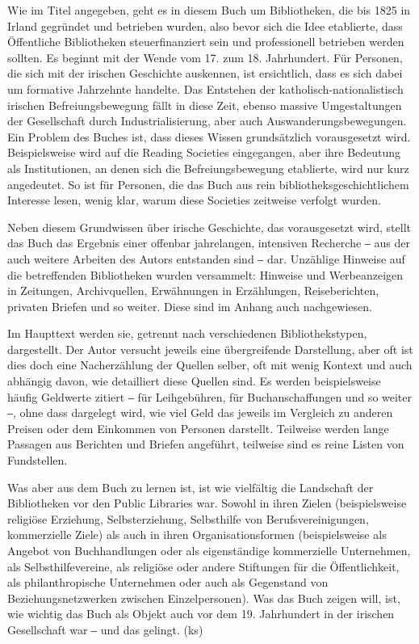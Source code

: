 \documentclass[a4paper,
fontsize=11pt,
oneside,
numbers=noperiodatend,
parskip=half-,
bibliography=totoc,
final
]{scrartcl}
\begin{document}
Wie im Titel angegeben, geht es in diesem Buch um Bibliotheken, die bis
1825 in Irland gegründet und betrieben wurden, also bevor sich die Idee
etablierte, dass Öffentliche Bibliotheken steuerfinanziert sein und
professionell betrieben werden sollten. Es beginnt mit der Wende vom 17.
zum 18. Jahrhundert. Für Personen, die sich mit der irischen Geschichte
auskennen, ist ersichtlich, dass es sich dabei um formative Jahrzehnte
handelte. Das Entstehen der katholisch-nationalistisch irischen
Befreiungsbewegung fällt in diese Zeit, ebenso massive Umgestaltungen
der Gesellschaft durch Industrialisierung, aber auch
Auswanderungsbewegungen. Ein Problem des Buches ist, dass dieses Wissen
grundsätzlich vorausgesetzt wird. Beispielsweise wird auf die Reading
Societies eingegangen, aber ihre Bedeutung als Institutionen, an denen
sich die Befreiungsbewegung etablierte, wird nur kurz angedeutet. So ist
für Personen, die das Buch aus rein bibliotheksgeschichtlichem Interesse
lesen, wenig klar, warum diese Societies zeitweise verfolgt wurden.

Neben diesem Grundwissen über irische Geschichte, das vorausgesetzt
wird, stellt das Buch das Ergebnis einer offenbar jahrelangen,
intensiven Recherche ‒ aus der auch weitere Arbeiten des Autors
entstanden sind ‒ dar. Unzählige Hinweise auf die betreffenden
Bibliotheken wurden versammelt: Hinweise und Werbeanzeigen in Zeitungen,
Archivquellen, Erwähnungen in Erzählungen, Reiseberichten, privaten
Briefen und so weiter. Diese sind im Anhang auch nachgewiesen.

Im Haupttext werden sie, getrennt nach verschiedenen Bibliothekstypen,
dargestellt. Der Autor versucht jeweils eine übergreifende Darstellung,
aber oft ist dies doch eine Nacherzählung der Quellen selber, oft mit
wenig Kontext und auch abhängig davon, wie detailliert diese Quellen
sind. Es werden beispielsweise häufig Geldwerte zitiert ‒ für
Leihgebühren, für Buchanschaffungen und so weiter ‒, ohne dass dargelegt
wird, wie viel Geld das jeweils im Vergleich zu anderen Preisen oder dem
Einkommen von Personen darstellt. Teilweise werden lange Passagen aus
Berichten und Briefen angeführt, teilweise sind es reine Listen von
Fundstellen.

Was aber aus dem Buch zu lernen ist, ist wie vielfältig die Landschaft
der Bibliotheken vor den Public Libraries war. Sowohl in ihren Zielen
(beispielsweise religiöse Erziehung, Selbsterziehung, Selbsthilfe von
Berufsvereinigungen, kommerzielle Ziele) als auch in ihren
Organisationsformen (beispielsweise als Angebot von Buchhandlungen oder
als eigenständige kommerzielle Unternehmen, als Selbsthilfevereine, als
religiöse oder andere Stiftungen für die Öffentlichkeit, als
philanthropische Unternehmen oder auch als Gegenstand von
Beziehungsnetzwerken zwischen Einzelpersonen). Was das Buch zeigen will,
ist, wie wichtig das Buch als Objekt auch vor dem 19. Jahrhundert in der
irischen Gesellschaft war ‒ und das gelingt. (ks)
\end{document}
